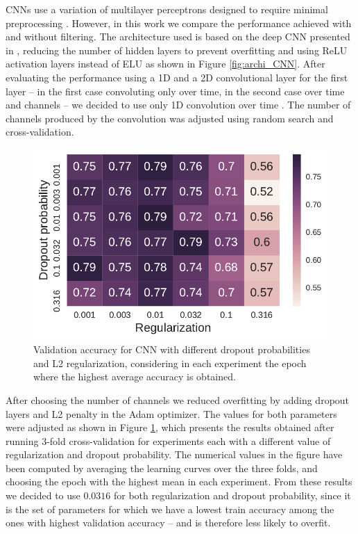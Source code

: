 \documentclass[10pt,conference,compsocconf]{IEEEtran}
\begin{document}
    CNNs use a variation of multilayer perceptrons designed to require minimal preprocessing \cite{LeNet5}. However, in this work we compare the performance achieved with and without filtering. The architecture used is based on the deep CNN presented in \cite{SchirrmeisterSF17}, reducing the number of hidden layers to prevent overfitting and using ReLU activation layers instead of ELU as shown in Figure \ref{fig:archi_CNN}. After evaluating the performance using a 1D and a 2D convolutional layer for the first layer -- in the first case convoluting only over time, in the second case over time and channels -- we decided to use only 1D convolution over time \cite{BashivanRYC15}. The number of channels produced by the convolution was adjusted using random search and cross-validation.
    
    \begin{figure}[t]
        \centering
        \includegraphics[width=\linewidth]{figures/cnntraintestmatrix.pdf}
        \caption{Validation accuracy for CNN with different dropout probabilities and L2 regularization, considering in each experiment the epoch where the highest average accuracy is obtained.}
        \label{fig:cnntraintestmatrix}
    \end{figure}
    
    After choosing the number of channels we reduced overfitting by adding dropout layers and L2 penalty in the Adam optimizer. The values for both parameters were adjusted as shown in Figure \ref{fig:cnntraintestmatrix}, which presents the results obtained after running 3-fold cross-validation for experiments each with a different value of regularization and dropout probability. The numerical values in the figure have been computed by averaging the learning curves over the three folds, and choosing the epoch with the highest mean in each experiment. From these results we decided to use $0.0316$ for both regularization and dropout probability, since it is the set of parameters for which we have a lowest train accuracy among the ones with highest validation accuracy -- and is therefore less likely to overfit.
\end{document}
